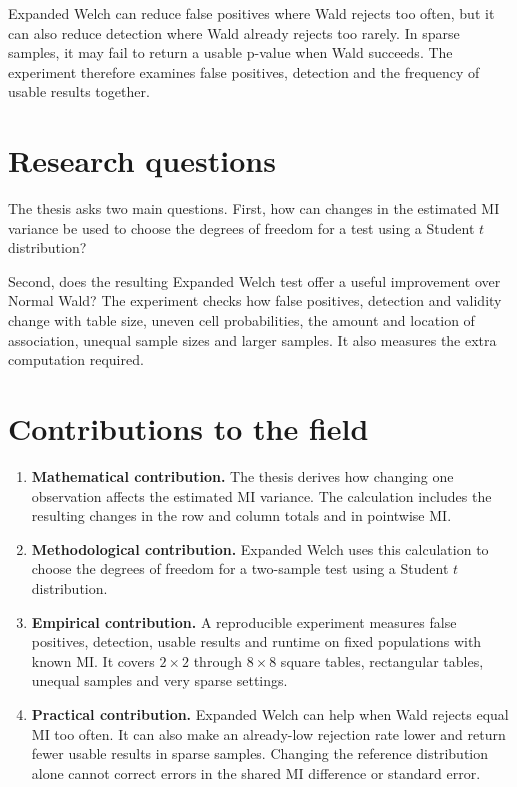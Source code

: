 Expanded Welch can reduce false positives
where Wald rejects too often, but it can also reduce detection where Wald
already rejects too rarely. In sparse samples, it may fail to return a usable
p-value when Wald succeeds. The experiment therefore examines false
positives, detection and the frequency of usable results together.

\section{Research questions}

The thesis asks two main questions. First, how can changes in the estimated
MI variance be used to choose the degrees of freedom for a test using a
Student \(t\) distribution?

Second, does the resulting Expanded Welch test offer a useful improvement
over Normal Wald?
The experiment checks how false positives, detection and validity change with
table size, uneven cell
probabilities, the amount and location of association, unequal sample sizes
and larger samples. It also measures the extra computation required.

\section{Contributions to the field}

\begin{enumerate}
  \item \begin{samepage}\textbf{Mathematical contribution.} The thesis derives how changing
  one observation affects the estimated MI variance. The calculation includes
  the resulting changes in the row and column totals and in pointwise MI.
  \par
  \end{samepage}

  \item \begin{samepage}\textbf{Methodological contribution.} Expanded Welch uses this
  calculation to choose the degrees of freedom for a two-sample test using a
  Student \(t\) distribution.
  \par
  \end{samepage}

  \item \begin{samepage}\textbf{Empirical contribution.} A reproducible experiment measures
  false positives, detection, usable results and runtime on fixed populations
  with known MI. It covers \(2\times2\) through \(8\times8\) square tables,
  rectangular tables, unequal samples and very sparse settings.
  \par
  \end{samepage}

  \item \textbf{Practical contribution.} Expanded Welch can help when Wald
  rejects equal MI too often. It can also make an already-low rejection rate
  lower and return fewer usable results in sparse samples. Changing the
  reference distribution alone cannot correct errors in the shared MI
  difference or standard error.
\end{enumerate}

